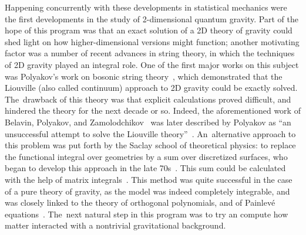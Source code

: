 \documentclass[pdftex]{sigma}
\numberwithin{equation}{section}
\begin{document}
Happening concurrently with these developments in statistical mechanics were the first developments in the study of 2-dimensional quantum gravity. Part of the hope of this program was that an exact solution of a 2D theory of gravity could shed light on how higher-dimensional versions might function; another motivating factor was a number of recent advances in string theory, in which the techniques of 2D gravity played an integral role. One of the first major works on this subject was Polyakov's work on bosonic string theory~\cite{Polyakov1}, which demonstrated that the Liouville (also called continuum) approach to 2D gravity could be exactly solved. The~drawback of this theory was that explicit calculations proved difficult, and hindered the theory for the next decade or so. Indeed, the aforementioned work of Belavin, Polyakov, and Zamolodchikov~\cite{BPZ} was later described
by Polyakov as ``an unsuccessful attempt to solve the Liouville theory''~\cite{Polyakov2}. An~alternative approach to this problem was put forth by the Saclay school of theoretical physics: to replace the functional integral over geometries by a sum over discretized surfaces, who began to develop this approach in the late 70s~\cite{BIPZ,IZ}. This sum could be calculated with the help of matrix integrals~\cite{DKKM, David,Kazakov4, KMK}. This method was quite successful in the case of a pure theory of gravity, as the model was indeed completely integrable, and was closely linked to the theory of orthogonal polynomials, and of Painlev\'{e} equations~\cite{FIK1,FIK2}. The~next natural step in this program was to try an compute how matter interacted with a nontrivial gravitational background.
\end{document}
